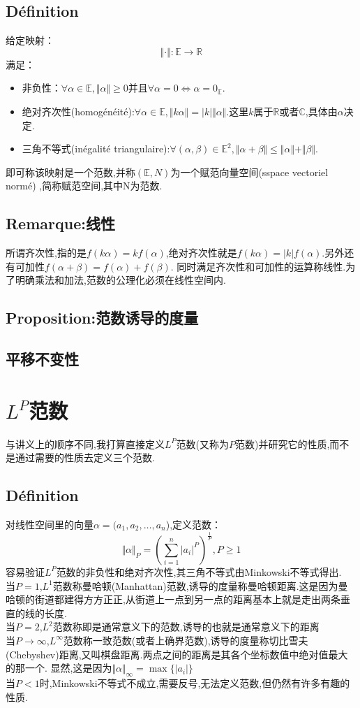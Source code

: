 \documentclass[12pt, a4paper, oneside]{ctexbook}
\newcommand{\R }{\mathbb{R}}%
\begin{document}
  \subsection{Définition}
  给定映射：
  $$
  \Vert \cdot \Vert : \mathbb{E} \longrightarrow \R
  $$
  满足：\begin{itemize}
    \item 非负性：$\forall\alpha\in\mathbb{E}, \Vert \alpha \Vert\ge0$并且$\forall\alpha=0\Leftrightarrow \alpha=0_\mathbb{E}$.
    \item 绝对齐次性(homogénéité):$\forall\alpha\in\mathbb{E}, \Vert k\alpha \Vert=| k | \Vert \alpha \Vert$.这里$k$属于$\R$或者$\mathbb{C}$,具体由$\alpha$决定.
    \item 三角不等式(inégalité triangulaire):$\forall(\alpha,\beta)\in\mathbb{E}^2, \Vert \alpha+\beta \Vert\leq\Vert \alpha \Vert+\Vert \beta \Vert$.
  \end{itemize}
  即可称该映射是一个范数,并称$(\mathbb{E},N)$为一个赋范向量空间(sspace vectoriel normé)
  ,简称赋范空间,其中N为范数.
  \subsection{Remarque:线性}
  所谓齐次性,指的是$f(k\alpha)=kf(\alpha)$,绝对齐次性就是$f(k\alpha)= | k | f(\alpha)$.另外还有可加性$f(\alpha+\beta)=f(\alpha)+f(\beta)$.
  同时满足齐次性和可加性的运算称线性.为了明确乘法和加法,范数的公理化必须在线性空间内.
  \subsection{Proposition:范数诱导的度量}
  \subsection{平移不变性}


\section{$L^P$范数}\label{myref:LPnorme}
与讲义上的顺序不同,我打算直接定义$L^P$范数(又称为$P$范数)并研究它的性质,而不是通过需要的性质去定义三个范数.
  \subsection{Définition}
  对线性空间里的向量$\alpha=(a_1,a_2,\dots,a_n$),定义范数：
  $$
    \Vert \alpha\Vert_P=(\sum_{i=1}^{n}|a_i|^P)^{\frac{1}{P}},P\ge1  
  $$
  容易验证$L^P$范数的非负性和绝对齐次性,其三角不等式由Minkowski不等式得出.\\
  当$P=1$,$L^1$范数称曼哈顿(Manhattan)范数,诱导的度量称曼哈顿距离.这是因为曼哈顿的街道都建得方方正正,从街道上一点到另一点的距离基本上就是走出两条垂直的线的长度.\\
  当$P=2$,$L^2$范数称即是通常意义下的范数,诱导的也就是通常意义下的距离\\
  当$P\rightarrow \infty$,$L^\infty$范数称一致范数(或者上确界范数),诱导的度量称切比雪夫(Chebyshev)距离,又叫棋盘距离.两点之间的距离是其各个坐标数值中绝对值最大的那一个.
  显然,这是因为$\Vert \alpha\Vert_\infty=\max\{|a_i|\}$\\
  当$P<1$时,Minkowski不等式不成立,需要反号,无法定义范数,但仍然有许多有趣的性质.
\end{document}
